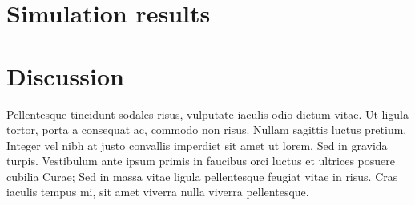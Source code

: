 \documentclass[11pt, a4paper]{article}
\theoremstyle{definition}
\theoremstyle{remark}
\begin{document}
\section{Simulation results}
\section{Discussion}
Pellentesque tincidunt sodales risus, vulputate iaculis odio dictum vitae. Ut ligula tortor, porta a consequat ac, commodo non risus. Nullam sagittis luctus pretium. Integer vel nibh at justo convallis imperdiet sit amet ut lorem. Sed in gravida turpis. Vestibulum ante ipsum primis in faucibus orci luctus et ultrices posuere cubilia Curae; Sed in massa vitae ligula pellentesque feugiat vitae in risus. Cras iaculis tempus mi, sit amet viverra nulla viverra pellentesque.
\end{document}
